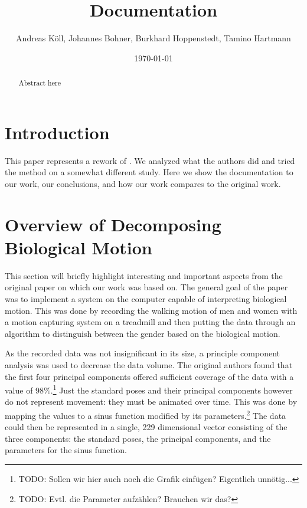 \documentclass[a4paper]{article}
\begin{document}
\title{Documentation}
\author{Andreas Köll, Johannes Bohner, Burkhard Hoppenstedt, Tamino Hartmann}
\date{\today}

\maketitle

\begin{abstract}

Abstract here
\end{abstract}
\newpage

\section{Introduction}

This paper represents a rework of \cite{origin}.
We analyzed what the authors did and tried the method on a somewhat different study.
Here we show the documentation to our work, our conclusions, and how our work compares to the original work.

\section{Overview of Decomposing Biological Motion}

This section will briefly highlight interesting and important aspects from the original paper on which our work was based on.
The general goal of the paper was to implement a system on the computer capable of interpreting biological motion.
This was done by recording the walking motion of men and women with a motion capturing system on a treadmill and then putting the data through an algorithm to distinguish between the gender based on the biological motion.

As the recorded data was not insignificant in its size, a principle component analysis was used to decrease the data volume.
The original authors found that the first four principal components offered sufficient coverage of the data with a value of 98\%.\footnote{TODO: Sollen wir hier auch noch die Grafik einfügen? Eigentlich unnötig...}
Just the standard poses and their principal components however do not represent movement: they must be animated over time.
This was done by mapping the values to a sinus function modified by its parameters.\footnote{TODO: Evtl. die Parameter aufzählen? Brauchen wir das?}
The data could then be represented in a single, 229 dimensional vector consisting of the three components: the standard poses, the principal components, and the parameters for the sinus function.
\end{document}
